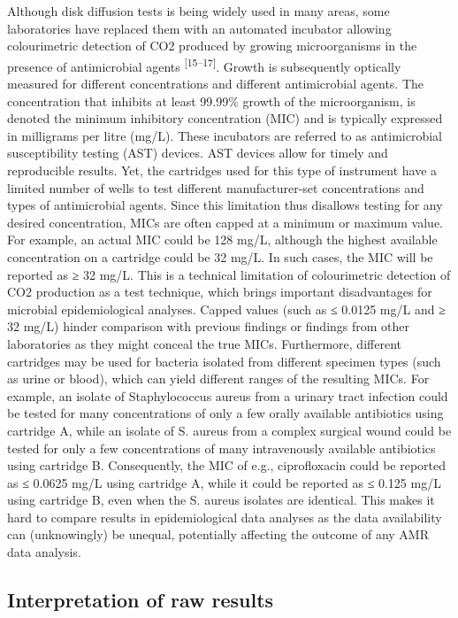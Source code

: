 \documentclass[
]{book}
\begin{document}
Although disk diffusion tests is being widely used in many areas, some laboratories have replaced them with an automated incubator allowing colourimetric detection of CO2 produced by growing microorganisms in the presence of antimicrobial agents \textsuperscript{{[}15--17{]}}. Growth is subsequently optically measured for different concentrations and different antimicrobial agents. The concentration that inhibits at least 99.99\% growth of the microorganism, is denoted the minimum inhibitory concentration (MIC) and is typically expressed in milligrams per litre (mg/L). These incubators are referred to as antimicrobial susceptibility testing (AST) devices. AST devices allow for timely and reproducible results. Yet, the cartridges used for this type of instrument have a limited number of wells to test different manufacturer-set concentrations and types of antimicrobial agents. Since this limitation thus disallows testing for any desired concentration, MICs are often capped at a minimum or maximum value. For example, an actual MIC could be 128 mg/L, although the highest available concentration on a cartridge could be 32 mg/L. In such cases, the MIC will be reported as ≥ 32 mg/L. This is a technical limitation of colourimetric detection of CO2 production as a test technique, which brings important disadvantages for microbial epidemiological analyses. Capped values (such as ≤ 0.0125 mg/L and ≥ 32 mg/L) hinder comparison with previous findings or findings from other laboratories as they might conceal the true MICs. Furthermore, different cartridges may be used for bacteria isolated from different specimen types (such as urine or blood), which can yield different ranges of the resulting MICs. For example, an isolate of Staphylococcus aureus from a urinary tract infection could be tested for many concentrations of only a few orally available antibiotics using cartridge A, while an isolate of S. aureus from a complex surgical wound could be tested for only a few concentrations of many intravenously available antibiotics using cartridge B. Consequently, the MIC of e.g., ciprofloxacin could be reported as ≤ 0.0625 mg/L using cartridge A, while it could be reported as ≤ 0.125 mg/L using cartridge B, even when the S. aureus isolates are identical. This makes it hard to compare results in epidemiological data analyses as the data availability can (unknowingly) be unequal, potentially affecting the outcome of any AMR data analysis.

\hypertarget{interpretation-of-raw-results}{%
\subsection{Interpretation of raw results}\label{interpretation-of-raw-results}}
\end{document}
